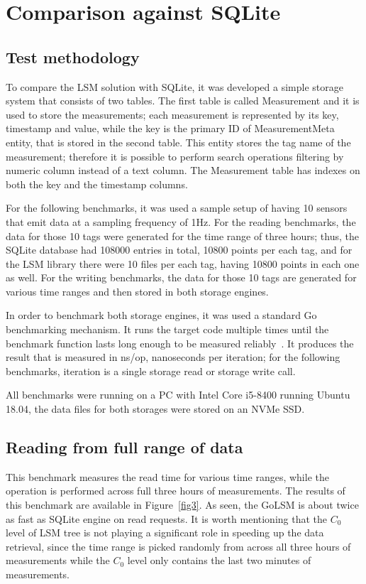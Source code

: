 \section{Comparison against SQLite}

\subsection{Test methodology}

To compare the LSM solution with SQLite, it was developed a simple storage system that consists of two tables. The first table is called Measurement and it is used to store the measurements; each measurement is represented by its key, timestamp and value, while the key is the primary ID of MeasurementMeta entity, that is stored in the second table. This entity stores the tag name of the measurement; therefore it is possible to perform search operations filtering by numeric column instead of a text column. The Measurement table has indexes on both the key and the timestamp columns.

For the following benchmarks, it was used a sample setup of having 10 sensors that emit data at a sampling frequency of 1Hz. For the reading benchmarks, the data for those 10 tags were generated for the time range of three hours; thus, the SQLite database had 108000 entries in total, 10800 points per each tag, and for the LSM library there were 10 files per each tag, having 10800 points in each one as well. For the writing benchmarks, the data for those 10 tags are generated for various time ranges and then stored in both storage engines.

In order to benchmark both storage engines, it was used a standard Go benchmarking mechanism. It runs the target code multiple times until the benchmark function lasts long enough to be measured reliably~\cite{go_benchmark}. It produces the result that is measured in ns/op, nanoseconds per iteration; for the following benchmarks, iteration is a single storage read or storage write call.

All benchmarks were running on a PC with Intel Core i5-8400 running Ubuntu 18.04, the data files for both storages were stored on an NVMe SSD.

\subsection{Reading from full range of data}

This benchmark measures the read time for various time ranges, while the operation is performed across full three hours of measurements. The results of this benchmark are available in Figure~\ref{fig3}. As seen, the GoLSM is about twice as fast as SQLite engine on read requests. It is worth mentioning that the $C_0$ level of LSM tree is not playing a significant role in speeding up the data retrieval, since the time range is picked randomly from across all three hours of measurements while the $C_0$ level only contains the last two minutes of measurements.

